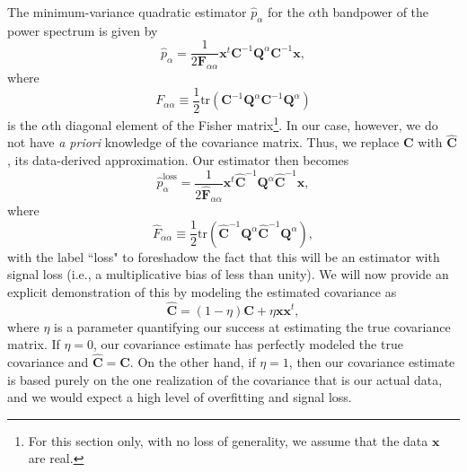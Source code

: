 \documentclass[preprint2,numberedappendix,tighten]{aastex6}  %
\newcommand{\x}{\mathbf{x}}
\newcommand{\C}{\mathbf{C}}
\newcommand{\Chat}{\mathbf{\hat{C}}}
\newcommand{\F}{\mathbf{F}}
\newcommand{\Q}{\mathbf{Q}}
\begin{document}
The minimum-variance quadratic estimator $\hat{p}_\alpha$ for the $\alpha$th bandpower of the power spectrum is given by 
\begin{equation}
\hat{p}_\alpha = \frac{1} {2 \F_{\alpha \alpha} }\x^t \C^{-1} \Q^{\alpha} \C^{-1} \x,
\end{equation}
where
\begin{equation}
F_{\alpha \alpha} \equiv \frac{1}{2} \textrm{tr} \left( \C^{-1} \Q^\alpha \C^{-1} \Q^\alpha \right)
\end{equation}
is the $\alpha$th diagonal element of the Fisher matrix\footnote{For this section only, with no loss of generality, we assume that the data $\textbf{x}$ are real.}. In our case, however, we do not have \emph{a priori} knowledge of the covariance matrix. Thus, we replace $\C$ with $\Chat$, its data-derived approximation. Our estimator then becomes
\begin{equation}
\label{eq:phatloss}
\hat{p}_\alpha^\textrm{loss} = \frac{1} {2 \hat{\F}_{\alpha \alpha} }\x^t \Chat^{-1} \Q^{\alpha} \Chat^{-1} \x,
\end{equation}
where
\begin{equation}
\hat{F}_{\alpha \alpha} \equiv \frac{1}{2} \textrm{tr} \left( \Chat^{-1} \Q^\alpha \Chat^{-1} \Q^\alpha \right),
\end{equation}
with the label ``loss" to foreshadow the fact that this will be an estimator with signal loss (i.e., a multiplicative bias of less than unity). We will now provide an explicit demonstration of this by modeling the estimated covariance as
\begin{equation}
\label{eq:ChatDef}
\Chat = (1-\eta) \C + \eta \x \x^t,
\end{equation}
where $\eta$ is a parameter quantifying our success at estimating the true covariance matrix. If $\eta = 0$, our covariance estimate has perfectly modeled the true covariance and $\Chat = \C$. On the other hand, if $\eta =1$, then our covariance estimate is based purely on the one realization of the covariance that is our actual data, and we would expect a high level of overfitting and signal loss.
\end{document}
